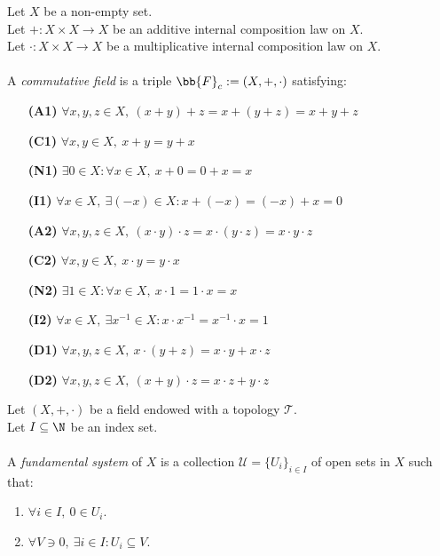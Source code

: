 \begin{definition-pre}
    \label{def:commutative_field}
    Let $X$ be a non-empty set. \\
    Let $+: X\times X \to X$ be an additive internal composition law on $X$. \\
    Let $\cdot: X\times X \to X$ be a multiplicative internal composition law on $X$. \\\\
    A \textit{commutative field} is a triple $\bb{F}_c:= (X, +, \cdot)$ satisfying:
    \begin{enumerate}
        \item [\textbf{(A1)}] $\forall x,y,z\in X,\ (x+y)+z= x+(y+z) = x+y+z$
        \item [\textbf{(C1)}] $\forall x,y\in X,\ x+y = y+x$
        \item [\textbf{(N1)}] $\exists 0 \in X : \forall x \in X,\ x+0 = 0+x = x$
        \item [\textbf{(I1)}] $\forall x \in X,\ \exists (-x)\in X: x+(-x) = (-x)+x = 0$
        \item [\textbf{(A2)}] $\forall x,y,z\in X,\ (x\cdot y)\cdot z= x\cdot(y\cdot z) = x\cdot y\cdot z$
        \item [\textbf{(C2)}] $\forall x,y\in X,\ x\cdot y = y\cdot x$
        \item [\textbf{(N2)}] $\exists 1 \in X : \forall x \in X,\ x\cdot1 = 1\cdot x = x$
        \item [\textbf{(I2)}] $\forall x \in X,\ \exists x^{-1}\in X: x\cdot x^{-1} = x^{-1}\cdot x = 1$
        \item [\textbf{(D1)}] $\forall x,y,z \in X,\ x\cdot(y+z)=x\cdot y+x\cdot z$
        \item [\textbf{(D2)}] $\forall x,y,z \in X,\ (x+y)\cdot z=x\cdot z+y\cdot z$
    \end{enumerate}
\end{definition-pre}

\begin{definition-pre}
	\label{def:fundamental_system}
    Let $(X, +, \cdot)$ be a field endowed with a topology $\mathcal{T}$. \\
    Let $I \subseteq \N$ be an index set. \\\\
    A \textit{fundamental system} of $X$ is a collection \( \mathcal{U} = \{ U_i \}_{i \in I} \) of open sets in \( X \) such that:
	\begin{enumerate}
		\item $\forall i \in I,\ 0 \in U_i$.
		\item $\forall V \ni 0,\ \exists i \in I : U_i \subseteq V$.
	\end{enumerate}
\end{definition-pre}

